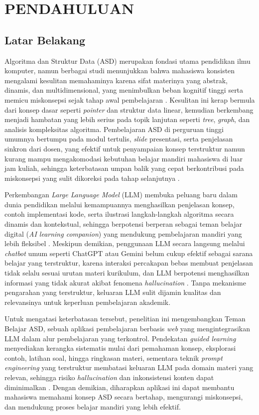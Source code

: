 \cleardoublepage %
\chapter{PENDAHULUAN}
\label{chap:pendahuluan}
\section{Latar Belakang}
Algoritma dan Struktur Data (ASD) merupakan fondasi utama pendidikan ilmu komputer, namun berbagai studi menunjukkan bahwa mahasiswa konsisten mengalami kesulitan memahaminya karena sifat materinya yang abstrak, dinamis, dan multidimensional, yang menimbulkan beban kognitif tinggi serta memicu miskonsepsi sejak tahap awal pembelajaran \cite{Mtaho2024}. Kesulitan ini kerap bermula dari konsep dasar seperti \textit{pointer} dan struktur data linear, kemudian berkembang menjadi hambatan yang lebih serius pada topik lanjutan seperti \textit{tree}, \textit{graph}, dan analisis kompleksitas algoritma. Pembelajaran ASD di perguruan tinggi umumnya bertumpu pada modul tertulis, \textit{slide} presentasi, serta penjelasan sinkron dari dosen, yang efektif untuk penyampaian konsep terstruktur namun kurang mampu mengakomodasi kebutuhan belajar mandiri mahasiswa di luar jam kuliah, sehingga keterbatasan umpan balik yang cepat berkontribusi pada miskonsepsi yang sulit dikoreksi pada tahap selanjutnya \cite{Leinonen2023}.

Perkembangan \textit{Large Language Model} (LLM) membuka peluang baru dalam dunia pendidikan melalui kemampuannya menghasilkan penjelasan konsep, contoh implementasi kode, serta ilustrasi langkah-langkah algoritma secara dinamis dan kontekstual, sehingga berpotensi berperan sebagai teman belajar digital (\textit{AI learning companion}) yang mendukung pembelajaran mandiri yang lebih fleksibel \cite{Kasneci2023}. Meskipun demikian, penggunaan LLM secara langsung melalui \textit{chatbot} umum seperti ChatGPT atau Gemini belum cukup efektif sebagai sarana belajar yang terstruktur, karena interaksi percakapan bebas membuat penjelasan tidak selalu sesuai urutan materi kurikulum, dan LLM berpotensi menghasilkan informasi yang tidak akurat akibat fenomena \textit{hallucination} \cite{Raihan2024}. Tanpa mekanisme pengarahan yang terstruktur, keluaran LLM sulit dijamin kualitas dan relevansinya untuk keperluan pembelajaran akademik.

Untuk mengatasi keterbatasan tersebut, penelitian ini mengembangkan Teman Belajar ASD, sebuah aplikasi pembelajaran berbasis \textit{web} yang mengintegrasikan LLM dalam alur pembelajaran yang terkontrol. Pendekatan \textit{guided learning} menyediakan kerangka sistematis mulai dari pemahaman konsep, eksplorasi contoh, latihan soal, hingga ringkasan materi, sementara teknik \textit{prompt engineering} yang terstruktur membatasi keluaran LLM pada domain materi yang relevan, sehingga risiko \textit{hallucination} dan inkonsistensi konten dapat diminimalkan \cite{White2023PromptPatternCatalog}. Dengan demikian, diharapkan aplikasi ini dapat membantu mahasiswa memahami konsep ASD secara bertahap, mengurangi miskonsepsi, dan mendukung proses belajar mandiri yang lebih efektif.
